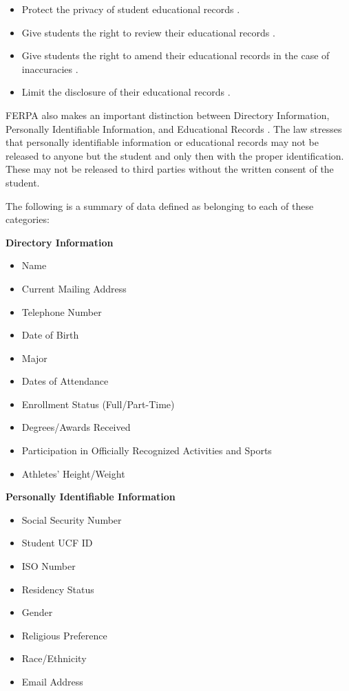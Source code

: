 \documentclass[titlepage, 12pt]{article}
\begin{document}
\begin{itemize}

    \item Protect the privacy of student educational records \cite{bib-1-3}.
    \item Give students the right to review their educational records \cite{bib-1-3}.
    \item Give students the right to amend their educational records in the case of inaccuracies \cite{bib-1-3}.
    \item Limit the disclosure of their educational records \cite{bib-1-3}.

\end{itemize}

FERPA also makes an important distinction between Directory Information, Personally Identifiable Information, and Educational Records \cite{bib-1-3}. The law stresses that personally identifiable information or educational records may not be released to anyone but the student and only then with the proper identification. These may not be released to third parties without the written consent of the student.

The following is a summary of data defined as belonging to each of these categories:

\textbf{Directory Information}
\begin{itemize}
    \item Name
    \item Current Mailing Address
    \item Telephone Number
    \item Date of Birth
    \item Major
    \item Dates of Attendance
    \item Enrollment Status (Full/Part-Time)
    \item Degrees/Awards Received
    \item Participation in Officially Recognized Activities and Sports
    \item Athletes’ Height/Weight
\end{itemize}

\textbf{Personally Identifiable Information}
\begin{itemize}
    \item Social Security Number
    \item Student UCF ID
    \item ISO Number
    \item Residency Status
    \item Gender
    \item Religious Preference
    \item Race/Ethnicity
    \item Email Address
\end{itemize}
\end{document}
